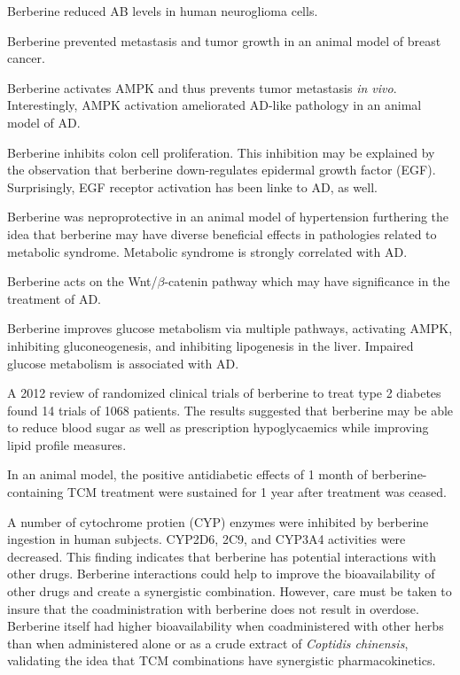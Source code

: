 Berberine reduced AB levels in human neuroglioma cells.
\cite{asai2007berberine}




Berberine prevented metastasis and tumor growth in
an animal model of breast cancer.
\cite{refaat2013berberine}

Berberine activates AMPK and thus prevents
tumor metastasis \textit{in vivo}.
\cite{kim2012berberine}
Interestingly, AMPK activation ameliorated AD-like pathology
in an animal model of AD.
\cite{du2015ampk}

Berberine inhibits colon cell proliferation.
This inhibition may be explained by the observation that
berberine down-regulates epidermal growth factor (EGF).
\cite{wang2013berberine}
Surprisingly, EGF receptor activation has been
linke to AD, as well.
\cite{birecree1988immunoreactive}

Berberine was neproprotective in an animal model of
hypertension furthering the idea that berberine
may have diverse beneficial effects in
pathologies related to metabolic syndrome.
\cite{kishimoto2015effects}
Metabolic syndrome is strongly correlated with AD.
\cite{razay2007metabolic}


Berberine acts on the Wnt/$\beta$-catenin pathway
\cite{wu2012berberine}
which may have significance in the treatment of AD.
\cite{esposito2006marijuana}




Berberine improves glucose metabolism via multiple pathways,
activating AMPK, inhibiting gluconeogenesis,
and inhibiting lipogenesis in the liver.
\cite{xia2011berberine}
Impaired glucose metabolism is associated with AD.
\cite{baker2011insulin}

A 2012 review of randomized clinical trials of berberine
to treat type 2 diabetes found 14 trials of 1068 patients.
The results suggested that berberine may be able to reduce
blood sugar as well as prescription hypoglycaemics
while improving lipid profile measures.
\cite{dong2012berberine}

In an animal model,
the positive antidiabetic effects of
1 month of berberine-containing TCM treatment
were sustained for 1 year after treatment was ceased.
\cite{zhao2012sustained}


A number of cytochrome protien (CYP) enzymes were inhibited
by berberine ingestion in human subjects.
CYP2D6, 2C9, and CYP3A4 activities were decreased.
\cite{guo2012repeated}
This finding indicates that berberine has potential interactions with
other drugs. Berberine interactions could help to improve the
bioavailability of other drugs and create a synergistic
combination. However, care must be taken to insure that
the coadministration with berberine does not result in overdose.
Berberine itself had higher bioavailability when
coadministered with other herbs than when administered alone
or as a crude extract of \textit{Coptidis chinensis},
validating the idea that TCM combinations
have synergistic pharmacokinetics.
\cite{chen2013comparative}



